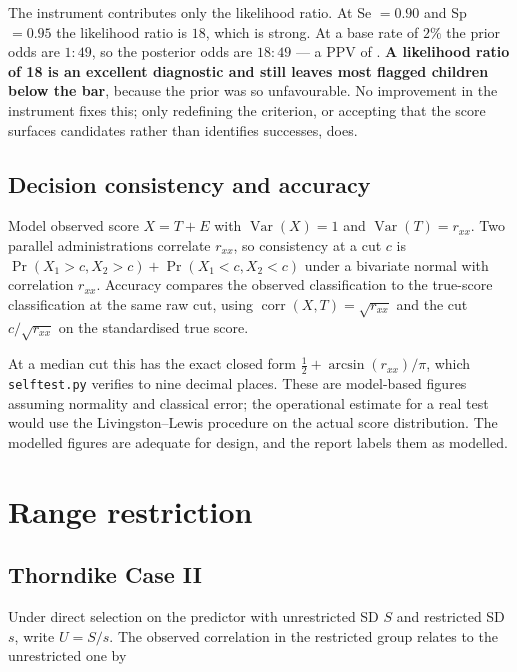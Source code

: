 The instrument contributes only the likelihood ratio. At Se $=0.90$ and
Sp $=0.95$ the likelihood ratio is $18$, which is strong. At a base rate of
$2\%$ the prior odds are $1{:}49$, so the posterior odds are $18{:}49$ --- a
PPV of \PPVtwoPercentGood{}. \textbf{A likelihood ratio of 18 is an excellent
diagnostic and still leaves most flagged children below the bar}, because the
prior was so unfavourable. No improvement in the instrument fixes this; only
redefining the criterion, or accepting that the score surfaces candidates rather
than identifies successes, does.

\subsection{Decision consistency and accuracy}

Model observed score $X=T+E$ with $\operatorname{Var}(X)=1$ and
$\operatorname{Var}(T)=r_{xx}$. Two parallel administrations correlate $r_{xx}$,
so consistency at a cut $c$ is
$\Pr(X_1>c,X_2>c)+\Pr(X_1<c,X_2<c)$ under a bivariate normal with correlation
$r_{xx}$. Accuracy compares the observed classification to the true-score
classification at the same raw cut, using
$\operatorname{corr}(X,T)=\sqrt{r_{xx}}$ and the cut $c/\sqrt{r_{xx}}$ on the
standardised true score.

At a median cut this has the exact closed form
$\tfrac12+\arcsin(r_{xx})/\pi$, which \texttt{selftest.py} verifies to nine
decimal places. These are model-based figures assuming normality and classical
error; the operational estimate for a real test would use the
Livingston--Lewis procedure on the actual score distribution. The modelled
figures are adequate for design, and the report labels them as modelled.

\section{Range restriction}
\label{app:range}

\subsection{Thorndike Case II}

Under direct selection on the predictor with unrestricted SD $S$ and restricted
SD $s$, write $U=S/s$. The observed correlation in the restricted group relates
to the unrestricted one by

